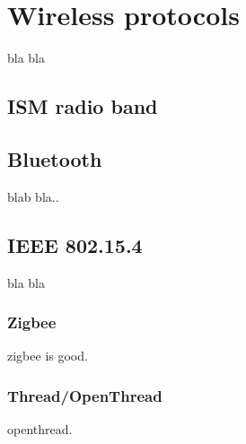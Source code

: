 \chapter{Wireless protocols}

bla bla

\section{ISM radio band}

\section{Bluetooth}

blab bla.\cite{ble_primer23}.

\section{IEEE 802.15.4}

bla bla

\subsection{Zigbee}
zigbee is good.

\subsection{Thread/OpenThread}
openthread.
